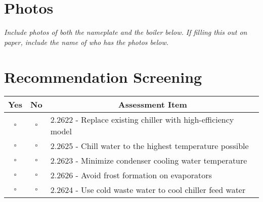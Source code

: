 \documentclass[./main.tex]{subfiles}
\begin{document}
\clearpage \section*{Photos}
\emph{Include photos of both the nameplate and the boiler below. If filling this out on paper, include the name of who has the photos below. }

\vspace{10cm}


\section*{Recommendation Screening}
\begin{tabular}{|c|c|p{13.5cm}|}
\hline
\multicolumn{1}{|c|}{\textbf{Yes}} & \multicolumn{1}{c|}{\textbf{No}} & \multicolumn{1}{c|}{\textbf{Assessment Item}} \\
\hline
$\square$ & $\square$ & 2.2622 - Replace existing chiller with high-efficiency model \\
\hline
$\square$ & $\square$ & 2.2625 - Chill water to the highest temperature possible \\
\hline
$\square$ & $\square$ & 2.2623 - Minimize condenser cooling water temperature \\
\hline
$\square$ & $\square$ & 2.2626 - Avoid frost formation on evaporators \\
\hline
$\square$ & $\square$ & 2.2624 - Use cold waste water to cool chiller feed water \\
\hline
\end{tabular}






\end{document}
